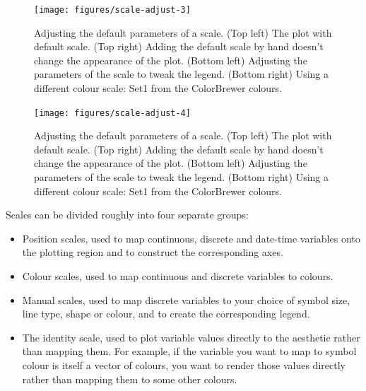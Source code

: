 \begin{figure}
\texttt{[image: figures/scale-adjust-3]} \caption{Adjusting the default parameters of a scale. (Top left) The plot with default scale. (Top right) Adding the default scale by hand doesn't change the appearance of the plot. (Bottom left) Adjusting the parameters of the scale to tweak the legend. (Bottom right) Using a different colour scale: Set1 from the ColorBrewer colours.\label{fig:scale-adjust3}}
\end{figure}

\begin{Shaded}
\begin{Highlighting}[]

\StringTok{ }\NormalTok{(} \NormalTok{)}
\end{Highlighting}
\end{Shaded}

\begin{figure}
\texttt{[image: figures/scale-adjust-4]} \caption{Adjusting the default parameters of a scale. (Top left) The plot with default scale. (Top right) Adding the default scale by hand doesn't change the appearance of the plot. (Bottom left) Adjusting the parameters of the scale to tweak the legend. (Bottom right) Using a different colour scale: Set1 from the ColorBrewer colours.\label{fig:scale-adjust4}}
\end{figure}


Scales can be divided roughly into four separate groups:

\begin{itemize}
\itemsep1pt\parskip0pt
\item
  Position scales, used to map continuous, discrete and date-time
  variables onto the plotting region and to construct the corresponding
  axes.
\item
  Colour scales, used to map continuous and discrete variables to
  colours.
\item
  Manual scales, used to map discrete variables to your choice of symbol
  size, line type, shape or colour, and to create the corresponding
  legend.
\item
  The identity scale, used to plot variable values directly to the
  aesthetic rather than mapping them. For example, if the variable you
  want to map to symbol colour is itself a vector of colours, you want
  to render those values directly rather than mapping them to some other
  colours.
\end{itemize}

